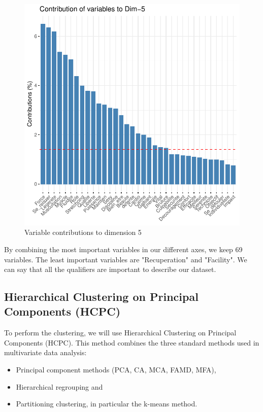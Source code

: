 \documentclass[12pt]{article}
\begin{document}
\begin{figure}[H]
\begin{center}
\includegraphics[scale=1.1]{ACP_5.pdf} 
\caption[]{ Variable contributions to  dimension 5 }
\end{center}
\end{figure}

By combining the most important variables in our different axes, we keep 69 variables. The least important variables are "Recuperation" and "Facility".
We can say that all the qualifiers are important to describe our dataset.


\subsection{Hierarchical Clustering on Principal Components (HCPC) }

To perform the clustering, we will use Hierarchical Clustering on Principal Components (HCPC).
This method combines the three standard methods used in multivariate data analysis:

    
 \begin{itemize}
    \item  Principal component methods (PCA, CA, MCA, FAMD, MFA),
    \item  Hierarchical regrouping and
    \item  Partitioning clustering, in particular the k-means method.
 \end{itemize}
\end{document}
